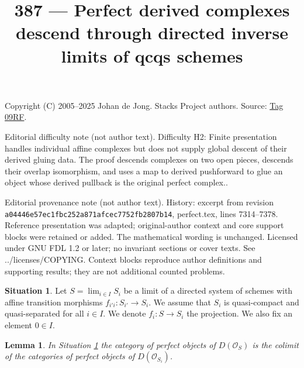 \documentclass{amsart}
\theoremstyle{plain}
\newtheorem{lemma}[subsection]{Lemma}
\theoremstyle{definition}
\newtheorem{situation}[subsection]{Situation}
\theoremstyle{remark}
\numberwithin{equation}{subsection}
\def\lim{\mathop{\mathrm{lim}}\nolimits}
\begin{document}
\title[Stacks Project, Tag 09RF]{387 --- Perfect derived complexes descend through directed inverse limits of qcqs schemes}
\maketitle
\noindent Copyright (C) 2005--2025 Johan de Jong. Stacks Project authors. Source: \href{https://stacks.math.columbia.edu/tag/09RF}{Tag 09RF}.

\noindent Editorial difficulty note (not author text). Difficulty H2: Finite presentation handles individual affine complexes but does not supply global descent of their derived gluing data. The proof descends complexes on two open pieces, descends their overlap isomorphism, and uses a map to derived pushforward to glue an object whose derived pullback is the original perfect complex..

\noindent Editorial provenance note (not author text). History: excerpt from revision \texttt{a0444\allowbreak 6e57e\allowbreak c1fbc\allowbreak 252a8\allowbreak 71afc\allowbreak ec775\allowbreak 2fb28\allowbreak 07b14}, perfect.tex, lines 7314--7378. Reference presentation was adapted; original-author context and core support blocks were retained or added. The mathematical wording is unchanged. Licensed under GNU FDL 1.2 or later; no invariant sections or cover texts. See ../licenses/COPYING. Context blocks reproduce author definitions and supporting results; they are not additional counted problems.

\begin{situation}
\label{situation-descent}
Let $S = \lim_{i \in I} S_i$ be a limit of a directed system of schemes
with affine transition morphisms $f_{i'i} : S_{i'} \to S_i$.
We assume that $S_i$ is quasi-compact and quasi-separated for all $i \in I$.
We denote $f_i : S \to S_i$ the projection. We also fix an element $0 \in I$.
\end{situation}

\begin{lemma}
\label{lemma-descend-perfect}
In Situation \ref{situation-descent} the category of perfect
objects of $D(\mathcal{O}_S)$ is the colimit of the categories
of perfect objects of $D(\mathcal{O}_{S_i})$.
\end{lemma}
\end{document}
